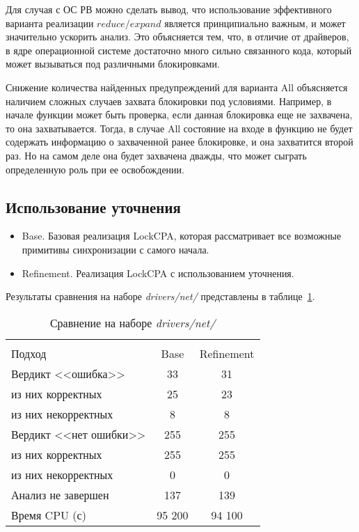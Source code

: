 Для случая с ОС РВ можно сделать вывод, что использование эффективного варианта реализации $reduce/expand$ является принципиально важным, и может значительно ускорить анализ.
Это объясняется тем, что, в отличие от драйверов, в ядре операционной системе достаточно много сильно связанного кода, который может вызываться под различными блокировками.

Снижение количества найденных предупреждений для варианта All объясняется наличием сложных случаев захвата блокировки под условиями.
Например, в начале функции может быть проверка, если данная блокировка еще не захвачена, то она захватывается. 
Тогда, в случае All состояние на входе в функцию не будет содержать информацию о захваченной ранее блокировке, и она захватится второй раз.
Но на самом деле она будет захвачена дважды, что может сыграть определенную роль при ее освобождении. 

\subsection{Использование уточнения}

\begin{itemize}
\item Base. Базовая реализация LockCPA, которая рассматривает все возможные примитивы синхронизации с самого начала.
\item Refinement. Реализация LockCPA с использованием уточнения.
\end{itemize}

Результаты сравнения на наборе \textit{drivers/net/} представлены в таблице~\ref{table-drivers-lock-refinement}.

  \begin{table}[h]\footnotesize \centering
    \caption{Сравнение на наборе \textit{drivers/net/}}
  	\label{table-drivers-lock-refinement}
    \begin{tabular}{ | l | c | c | }
      \hline 
      		& 		\multicolumn{2}{c|}{\combatmode}  \\
      Подход         				& Base   	& Refinement \\ \hline
      Вердикт <<ошибка>> 				& 33    	& 31       \\ 
  \hspace{0.5cm} из них корректных 	& 25 		& 23 		\\ 
  \hspace{0.5cm} из них некорректных & 8 		& 8 		\\ \hline
      Вердикт <<нет ошибки>>  		& 255      	& 255       	\\ 
  \hspace{0.5cm} из них корректных 	& 255 		& 255    	\\
  \hspace{0.5cm} из них некорректных & 0 		& 0    		\\ \hline
      Анализ не завершен       		& 137     	& 139        \\ \hline
      Время CPU (с)   				& 95 200 	& 94 100    \\ 
      \hline
    \end{tabular}
  \end{table}

